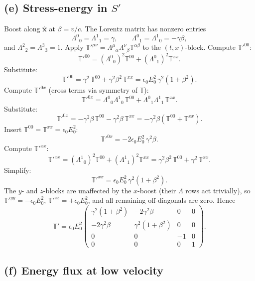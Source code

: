 \documentclass[11pt]{article}
\begin{document}
\subsection*{(e) Stress-energy in $S'$}

Boost along $\hat{\bm x}$ at $\beta=v/c$. The Lorentz matrix has nonzero entries
\[ \Lambda^0{}_0 = \Lambda^1{}_1 = \gamma,\qquad \Lambda^0{}_1 = \Lambda^1{}_0 = -\gamma\beta, \]
and $\Lambda^2{}_2 = \Lambda^3{}_3 = 1$. Apply $\mathbb{T}'^{\mu\nu}=\Lambda^\mu{}_\alpha\Lambda^\nu{}_\beta\mathbb{T}^{\alpha\beta}$ to the $(t,x)$-block. Compute $\mathbb{T}'^{00}$:
\[ \mathbb{T}'^{00} = (\Lambda^0{}_0)^2\mathbb{T}^{00} + (\Lambda^0{}_1)^2\mathbb{T}^{xx}. \]
Substitute:
\[ \mathbb{T}'^{00} = \gamma^2\,\mathbb{T}^{00} + \gamma^2\beta^2\,\mathbb{T}^{xx} = \epsilon_0 E_0^2\,\gamma^2(1+\beta^2). \]
Compute $\mathbb{T}'^{0x}$ (cross terms via symmetry of $\mathbb{T}$):
\[ \mathbb{T}'^{0x} = \Lambda^0{}_0\Lambda^1{}_0\,\mathbb{T}^{00} + \Lambda^0{}_1\Lambda^1{}_1\,\mathbb{T}^{xx}. \]
Substitute:
\[ \mathbb{T}'^{0x} = -\gamma^2\beta\,\mathbb{T}^{00} - \gamma^2\beta\,\mathbb{T}^{xx} = -\gamma^2\beta(\mathbb{T}^{00}+\mathbb{T}^{xx}). \]
Insert $\mathbb{T}^{00}=\mathbb{T}^{xx}=\epsilon_0 E_0^2$:
\[ \mathbb{T}'^{0x} = -2\epsilon_0 E_0^2\,\gamma^2\beta. \]
Compute $\mathbb{T}'^{xx}$:
\[ \mathbb{T}'^{xx} = (\Lambda^1{}_0)^2\mathbb{T}^{00} + (\Lambda^1{}_1)^2\mathbb{T}^{xx} = \gamma^2\beta^2\,\mathbb{T}^{00} + \gamma^2\,\mathbb{T}^{xx}. \]
Simplify:
\[ \mathbb{T}'^{xx} = \epsilon_0 E_0^2\,\gamma^2(1+\beta^2). \]
The $y$- and $z$-blocks are unaffected by the $x$-boost (their $\Lambda$ rows act trivially), so $\mathbb{T}'^{yy} = -\epsilon_0 E_0^2$, $\mathbb{T}'^{zz} = +\epsilon_0 E_0^2$, and all remaining off-diagonals are zero. Hence
\begin{equation}
\boxed{\mathbb{T}'=\epsilon_0 E_0^2\begin{pmatrix}\gamma^2(1+\beta^2) & -2\gamma^2\beta & 0 & 0\\ -2\gamma^2\beta & \gamma^2(1+\beta^2) & 0 & 0\\ 0 & 0 & -1 & 0 \\ 0 & 0 & 0 & 1\end{pmatrix}.}
\end{equation}

\subsection*{(f) Energy flux at low velocity}
\end{document}
